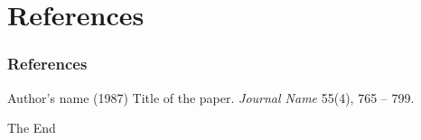 \documentclass{beamer}
\begin{document}
\section{References}
\begin{frame}
\frametitle{References}
\footnotesize {
\begin{thebibliography}{99}
  Author's name (1987)
 \newblock Title of the paper.
 \newblock \emph{Journal Name} 55(4), 765 -- 799.
\end{thebibliography}
}
\end{frame}

\begin{frame}
\centerline{The End}
\end{frame}
%
\end{document}
